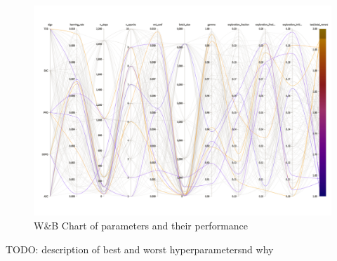 \documentclass[../xlapes02]{subfiles}
\begin{document}
    \begin{landscape}
        \begin{figure}
            \centering
            \includegraphics[width=\linewidth]{image/figure/wb}
            \caption{W\&B Chart of parameters and their performance}
            \label{fig:wb-chart}
        \end{figure}
    \end{landscape}

    TODO: description of best and worst hyperparametersnd why
\end{document}
